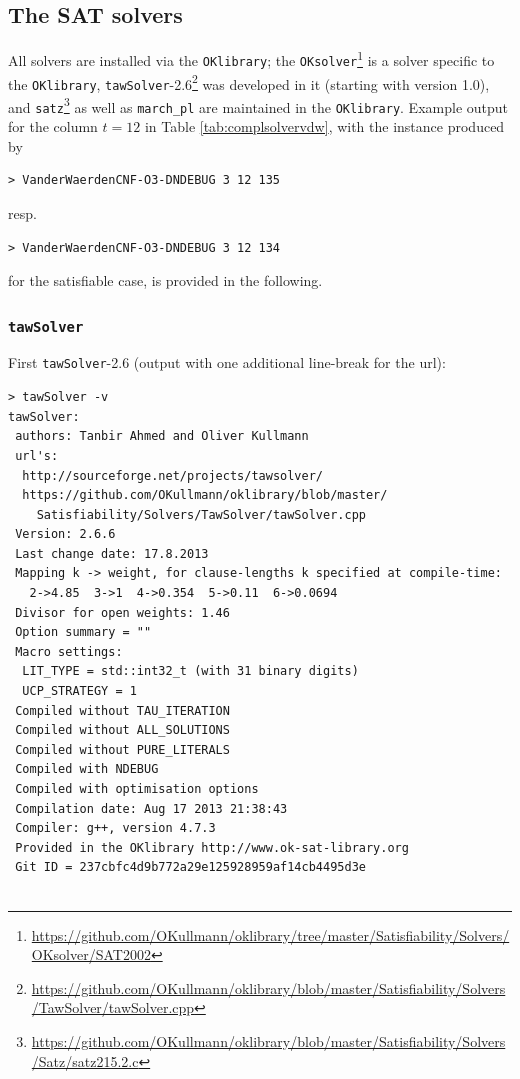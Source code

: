 \documentclass[final,3p,times]{elsarticle}
\theoremstyle{definition}
\newcommand{\OKlibrary}{\texttt{OKlibrary}}
\newcommand{\tawsolver}{\texttt{tawSolver}}
\newcommand{\ntawsolver}{\tawsolver-2.6}
\newcommand{\oksolver}{\texttt{OKsolver}}
\newcommand{\satz}{\texttt{satz}}
\newcommand{\march}{\texttt{march\_pl}}
\begin{document}
\begin{appendix}
\subsection{The SAT solvers}
\label{sec:OKlsolvers}

All solvers are installed via the \OKlibrary; the \oksolver{}\footnote{\url{https://github.com/OKullmann/oklibrary/tree/master/Satisfiability/Solvers/OKsolver/SAT2002}} is a solver specific to the \OKlibrary, \ntawsolver{}\footnote{\url{https://github.com/OKullmann/oklibrary/blob/master/Satisfiability/Solvers/TawSolver/tawSolver.cpp}} was developed in it (starting with version 1.0), and \satz{}\footnote{\url{https://github.com/OKullmann/oklibrary/blob/master/Satisfiability/Solvers/Satz/satz215.2.c}} as well as \march{} are maintained in the \OKlibrary{}. Example output for the column $t=12$ in Table \ref{tab:complsolvervdw}, with the instance produced by
\begin{verbatim}
> VanderWaerdenCNF-O3-DNDEBUG 3 12 135
\end{verbatim}
resp.
\begin{verbatim}
> VanderWaerdenCNF-O3-DNDEBUG 3 12 134
\end{verbatim}
for the satisfiable case, is provided in the following.


\subsubsection{\tawsolver}
\label{sec:okltaw}

First \ntawsolver{} (output with one additional line-break for the url):
\begin{verbatim}
> tawSolver -v
tawSolver:
 authors: Tanbir Ahmed and Oliver Kullmann
 url's:
  http://sourceforge.net/projects/tawsolver/
  https://github.com/OKullmann/oklibrary/blob/master/
    Satisfiability/Solvers/TawSolver/tawSolver.cpp
 Version: 2.6.6
 Last change date: 17.8.2013
 Mapping k -> weight, for clause-lengths k specified at compile-time:
   2->4.85  3->1  4->0.354  5->0.11  6->0.0694
 Divisor for open weights: 1.46
 Option summary = ""
 Macro settings:
  LIT_TYPE = std::int32_t (with 31 binary digits)
  UCP_STRATEGY = 1
 Compiled without TAU_ITERATION
 Compiled without ALL_SOLUTIONS
 Compiled without PURE_LITERALS
 Compiled with NDEBUG
 Compiled with optimisation options
 Compilation date: Aug 17 2013 21:38:43
 Compiler: g++, version 4.7.3
 Provided in the OKlibrary http://www.ok-sat-library.org
 Git ID = 237cbfc4d9b772a29e125928959af14cb4495d3e


\end{verbatim}
\end{appendix}
\end{document}
